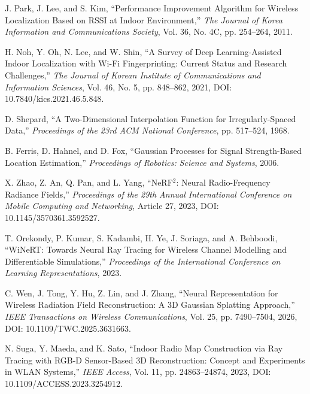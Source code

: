 \documentclass[11pt,a4paper]{article}
\begin{document}
\begin{enumerate}[label={[\arabic*]}, ref=\arabic*, leftmargin=2.6em, labelsep=0.6em, itemsep=3pt, topsep=4pt]
  \item\label{bib:8} J. Park, J. Lee, and S. Kim, ``Performance Improvement Algorithm for Wireless Localization Based on
RSSI at Indoor Environment,'' \textit{The Journal of Korea Information and Communications Society},
Vol. 36, No. 4C, pp. 254--264, 2011.

  \item\label{bib:9} H. Noh, Y. Oh, N. Lee, and W. Shin, ``A Survey of Deep Learning-Assisted Indoor Localization with
Wi-Fi Fingerprinting: Current Status and Research Challenges,'' \textit{The Journal of Korean
Institute of Communications and Information Sciences}, Vol. 46, No. 5, pp. 848--862, 2021, DOI:
10.7840/kics.2021.46.5.848.

  \item\label{bib:10} D. Shepard, ``A Two-Dimensional Interpolation Function for Irregularly-Spaced Data,''
\textit{Proceedings of the 23rd ACM National Conference}, pp. 517--524, 1968.

  \item\label{bib:11} B. Ferris, D. Hahnel, and D. Fox, ``Gaussian Processes for Signal Strength-Based Location
Estimation,'' \textit{Proceedings of Robotics: Science and Systems}, 2006.

  \item\label{bib:12} X. Zhao, Z. An, Q. Pan, and L. Yang, ``NeRF$^2$: Neural Radio-Frequency Radiance Fields,''
\textit{Proceedings of the 29th Annual International Conference on Mobile Computing and Networking},
Article 27, 2023, DOI: 10.1145/3570361.3592527.

  \item\label{bib:13} T. Orekondy, P. Kumar, S. Kadambi, H. Ye, J. Soriaga, and A. Behboodi, ``WiNeRT: Towards Neural Ray
Tracing for Wireless Channel Modelling and Differentiable Simulations,'' \textit{Proceedings of the
International Conference on Learning Representations}, 2023.

  \item\label{bib:14} C. Wen, J. Tong, Y. Hu, Z. Lin, and J. Zhang, ``Neural Representation for Wireless Radiation Field
Reconstruction: A 3D Gaussian Splatting Approach,'' \textit{IEEE Transactions on Wireless
Communications}, Vol. 25, pp. 7490--7504, 2026, DOI: 10.1109/TWC.2025.3631663.

  \item\label{bib:15} N. Suga, Y. Maeda, and K. Sato, ``Indoor Radio Map Construction via Ray Tracing with RGB-D
Sensor-Based 3D Reconstruction: Concept and Experiments in WLAN Systems,'' \textit{IEEE Access}, Vol.
11, pp. 24863--24874, 2023, DOI: 10.1109/ACCESS.2023.3254912.


\end{enumerate}
\end{document}
